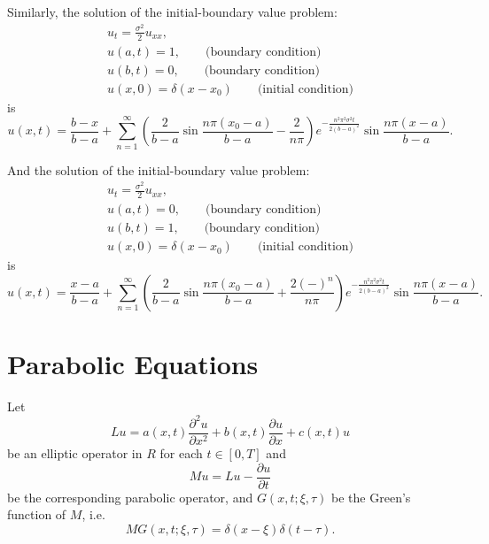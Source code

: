 Similarly, the solution of the initial-boundary value problem:
\begin{gather*}
	u_t = \frac{\sigma^2}{2} u_{xx},   \\
	u(a,t)=1,              \qquad \text{(boundary condition)}     \\
	u(b,t)=0,              \qquad \text{(boundary condition)}     \\
	u(x,0) = \delta(x-x_0) \qquad \text{(initial condition)}
\end{gather*}
is
\begin{equation}
	u(x,t) = \frac{b-x}{b-a}
	+ \sum_{n=1}^{\infty} 
	  \left( \frac{2}{b-a} \sin \frac{n\pi (x_0-a)}{b-a} -\frac{2}{n\pi} \right)
		e^{-\frac{n^2\pi^2 \sigma^2 t}{2(b-a)^2}} \sin \frac{n\pi (x-a)}{b-a}.
\end{equation}

And the solution of the initial-boundary value problem:
\begin{gather*}
	u_t = \frac{\sigma^2}{2} u_{xx},   \\
	u(a,t)=0,              \qquad \text{(boundary condition)}     \\
	u(b,t)=1,              \qquad \text{(boundary condition)}     \\
	u(x,0) = \delta(x-x_0) \qquad \text{(initial condition)}
\end{gather*}
is
\begin{equation}
	u(x,t) = \frac{x-a}{b-a}
	+ \sum_{n=1}^{\infty} 
	\left( \frac{2}{b-a} \sin \frac{n\pi (x_0-a)}{b-a} +\frac{2(-)^n}{n\pi} \right)
		e^{-\frac{n^2\pi^2 \sigma^2 t}{2(b-a)^2}} \sin \frac{n\pi (x-a)}{b-a}.
\end{equation}

\section{Parabolic Equations}
Let 
\begin{equation}
  L u = a(x,t) \frac{\partial^2 u}{\partial x^2} 
       + b(x,t) \frac{\partial u}{\partial x}  + c(x,t) u
\end{equation}
be an elliptic operator in $R$ for each $t\in[0,T]$ and 
\begin{equation}
  M u = L u - \frac{\partial u}{\partial t} 
\end{equation}
be the corresponding parabolic operator, and $G(x,t;\xi,\tau)$ 
be the Green's function of $M$, i.e.
\begin{equation}
  M G(x,t;\xi,\tau) = \delta(x-\xi) \delta(t-\tau).
\end{equation}

